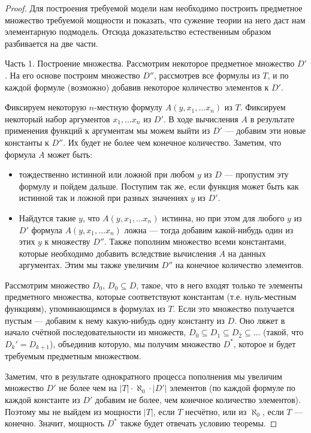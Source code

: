 \begin{proof}
Для построения требуемой модели нам необходимо построить предметное множество
требуемой мощности и показать, что сужение теории на него даст нам 
элементарную подмодель. Отсюда доказательство естественным образом
разбивается на две части.

Часть 1. Построение множества. 
Рассмотрим некоторое предметное множество $D'$. На его основе
построим множество $D''$, рассмотрев все формулы из $T$, и 
по каждой формуле (возможно) добавив некоторое количество элементов
к $D'$. 

Фиксируем некоторую $n$-местную 
формулу $A(y, x_1, \dots x_n)$ из $T$. 
Фиксируем некоторый набор аргументов $x_1, \dots x_n$ из $D'$.
В ходе вычисления $A$ в результате применения функций к аргументам мы можем
выйти из $D'$ --- добавим эти новые константы к $D''$. Их будет не
более чем конечное количество. Заметим, что формула $A$ может быть:
\begin{itemize}
\item тождественно истинной или ложной при любом $y$ из $D$ --- 
пропустим эту формулу и пойдем дальше. Поступим так же, если функция
может быть как истинной так и ложной при разных значениях $y$ из $D'$.
\item Найдутся такие $y$, что $A(y,x_1,\dots x_n)$ истинна, но при этом
для любого $y$ из $D'$ формула $A(y,x_1,\dots x_n)$ ложна --- тогда
добавим какой-нибудь один из этих $y$ к множеству $D''$. Также пополним
множество всеми константами, которые необходимо добавить вследствие
вычисления $A$ на данных аргументах. Этим мы также увеличим $D''$ на
конечное количество элементов.
\end{itemize}

Рассмотрим множество $D_0$, $D_0 \subseteq D$,
такое, что в него входят только те элементы предметного множества, которые
соответствуют константам (т.е. нуль-местным функциям), упоминающимся в
формулах из $T$. Если это множество получается пустым --- добавим 
к нему какую-нибудь одну константу из $D$. Оно ляжет в начало счётной
последовательности из множеств, $D_0 \subseteq D_1 \subseteq D_2 \subseteq \dots$
(такой, что $D_k' = D_{k+1}$), 
объединив которую, 
мы получим множество $D^*$, которое и будет требуемым предметным 
множеством.

Заметим, что в результате однократного процесса пополнения мы увеличим
множество $D'$ не более чем на $|T|\cdot \aleph_0\cdot|D'|$ элементов
(по каждой формуле по каждой константе из $D'$ добавим не более, чем конечное 
количество элементов). Поэтому мы не выйдем из мощности $|T|$, если $T$
несчётно, или из $\aleph_0$, если $T$ --- конечно.
Значит, мощность $D^*$ также будет отвечать условию теоремы.


\end{proof}
